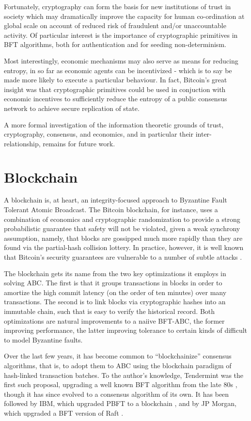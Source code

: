 Fortunately, cryptography can form the basis for new institutions of trust in society 
which may dramatically improve the capacity for human co-ordination at global scale on account
of reduced risk of fraudulent and/or unaccountable activity.
Of particular interest is the importance of cryptographic primitives in BFT algorithms,
both for authentication and for seeding non-determinism.

Most interestingly, economic mechanisms may also serve as means for reducing entropy,
in so far as economic agents can be incentivized - 
which is to say be made more likely to execute a particular behaviour.
In fact, Bitcoin's great insight was that cryptographic primitives could be used in
conjuction with economic incentives to sufficiently reduce the entropy of a public consensus network
to achieve secure replication of state.

A more formal investigation of the information theoretic grounds of trust, cryptography,
consensus, and economics, and in particular their inter-relationship, remains for future work.

\section{Blockchain}

A blockchain is, at heart, an integrity-focused approach to Byzantine Fault Tolerant Atomic Broadcast.
The Bitcoin blockchain, for instance, uses a combination of economics and cryptographic randomization 
to provide a strong probabilistic guarantee that safety will not be violated, 
given a weak synchrony assumption, namely, 
that blocks are gossipped much more rapidly than they are found via the partial-hash collision lottery.
In practice, however, it is well known that Bitcoin's security guarantees are vulnerable to a number 
of subtle attacks \cite{courtois2014subversive,eyal2014majority}.


The blockchain gets its name from the two key optimizations it employs in solving ABC.
The first is that it groups transactions in blocks in order to amortize the high commit latency 
(on the order of ten minutes) over many transactions.
The second is to link blocks via cryptographic hashes into an immutable chain,
such that is easy to verify the historical record.
Both optimizations are natural improvements to a naiive BFT-ABC,
the former improving performance, the latter improving tolerance to certain kinds 
of difficult to model Byzantine faults.

Over the last few years, it has become common to ``blockchainize'' consensus algorithms,
that is, to adopt them to ABC using the blockchain paradigm of hash-linked transaction batches.
To the author's knowledge, Tendermint was the first such proposal, 
upgrading a well known BFT algorithm from the late 80s \cite{dls},
though it has since evolved to a consensus algorithm of its own.
It has been followed by IBM, which upgraded PBFT to a blockchain \cite{cachin2016non,obc},
and by JP Morgan, which upgraded a BFT version of Raft \cite{juno}.

